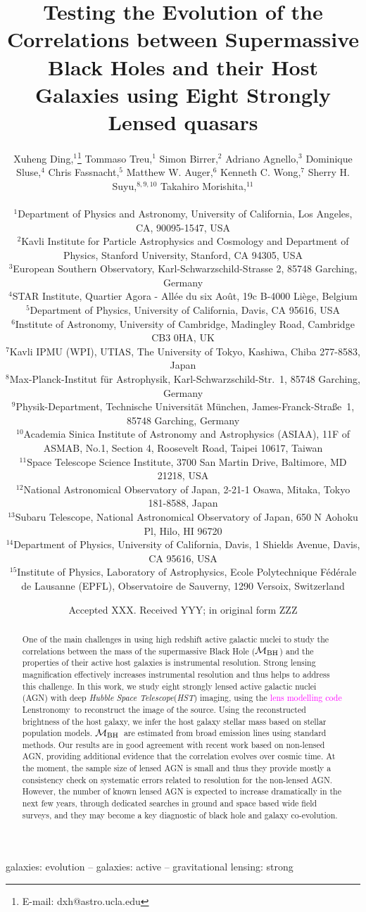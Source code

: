 \documentclass[fleqn,usenatbib]{mnras}
\title[Mass relations by lensed AGN hosts]{Testing the Evolution of the Correlations between Supermassive Black Holes and their Host Galaxies using Eight Strongly Lensed quasars}
\author[X. Ding et al.]{
Xuheng Ding,$^{1}$\thanks{E-mail: dxh@astro.ucla.edu}
Tommaso Treu,$^{1}$
Simon Birrer,$^{2}$
Adriano Agnello,$^{3}$\newauthor
Dominique Sluse,$^{4}$
Chris Fassnacht,$^{5}$
Matthew W. Auger,$^{6}$
Kenneth C. Wong,$^{7}$ \newauthor
Sherry H. Suyu,$^{8,9,10}$
Takahiro Morishita,$^{11}$
\pink{
Cristian E. Rusu,$^{12,13,14}$
Aymeric Galan,$^{15}$}
\\
\\
$^{1}$Department of Physics and Astronomy, University of California, Los Angeles, CA, 90095-1547, USA\\
$^{2}$Kavli Institute for Particle Astrophysics and Cosmology and Department of Physics, Stanford University, Stanford, CA 94305, USA\\
$^{3}$European Southern Observatory, Karl-Schwarzschild-Strasse 2, 85748 Garching, Germany\\
$^{4}$STAR Institute, Quartier Agora - All\'ee du six Ao\^ut, 19c B-4000 Li\`ege, Belgium\\
$^{5}$Department of Physics, University of California, Davis, CA 95616, USA\\
$^{6}$Institute of Astronomy, University of Cambridge, Madingley Road, Cambridge CB3 0HA, UK\\
$^{7}$Kavli IPMU (WPI), UTIAS, The University of Tokyo, Kashiwa, Chiba 277-8583, Japan\\
$^{8}$Max-Planck-Institut f{\"u}r Astrophysik, Karl-Schwarzschild-Str.~1, 85748 Garching, Germany\\
$^{9}$Physik-Department, Technische Universit\"at M\"unchen, James-Franck-Stra\ss{}e~1, 85748 Garching, Germany\\
$^{10}$Academia Sinica Institute of Astronomy and Astrophysics (ASIAA), 11F of ASMAB, No.1, Section 4, Roosevelt Road, Taipei 10617, Taiwan\\
$^{11}$Space Telescope Science Institute, 3700 San Martin Drive, Baltimore, MD 21218, USA\\
$^{12}$National Astronomical Observatory of Japan, 2-21-1 Osawa, Mitaka, Tokyo 181-8588, Japan\\
$^{13}$Subaru Telescope, National Astronomical Observatory of Japan, 650 N Aohoku Pl, Hilo, HI 96720\\
$^{14}$Department of Physics, University of California, Davis, 1 Shields Avenue, Davis, CA 95616, USA\\
$^{15}$Institute of Physics, Laboratory of Astrophysics, Ecole Polytechnique 
F\'ed\'erale de Lausanne (EPFL), Observatoire de Sauverny, 1290 Versoix, 
Switzerland
}
\date{Accepted XXX. Received YYY; in original form ZZZ}
\newcommand{\hst}{{\it HST}}
\newcommand{\mbh}{$\mathcal M_{\rm BH}$}
\newcommand{\lenstronomy}{{\sc Lenstronomy}}
\newcommand{\pink}[1]{{\textcolor{magenta}{#1}}}
\begin{document}
\label{firstpage}
\pagerange{\pageref{firstpage}--\pageref{lastpage}}
\maketitle

\begin{abstract}
  One of the main challenges in using high redshift active galactic nuclei to study the correlations between the mass of the supermassive Black Hole (\mbh) and the properties of their active host galaxies is instrumental resolution. Strong lensing magnification effectively increases instrumental resolution and thus helps to address this challenge. In this work, we study eight strongly lensed active galactic nuclei (AGN) with deep {\it Hubble Space Telescope}(\hst) imaging, using the \pink{lens modelling code} \lenstronomy\ to reconstruct the image of the source. Using the reconstructed brightness of the host galaxy, we infer the host galaxy stellar mass based on stellar population models. 
  \mbh\ are estimated from broad emission lines using standard methods. Our results are in good agreement with recent work based on non-lensed AGN, providing additional evidence that the correlation evolves over cosmic time.  At the moment, the sample size of lensed AGN is small and thus they provide mostly a consistency check on systematic errors related to resolution for the non-lensed AGN. However, the number of known lensed AGN is expected to increase dramatically in the next few years, through dedicated searches in ground and space based wide field surveys, and they may become a key diagnostic of black hole and galaxy co-evolution. 
\end{abstract}

\begin{keywords}
galaxies: evolution -- galaxies: active -- gravitational lensing: strong
\end{keywords}


\end{document}

